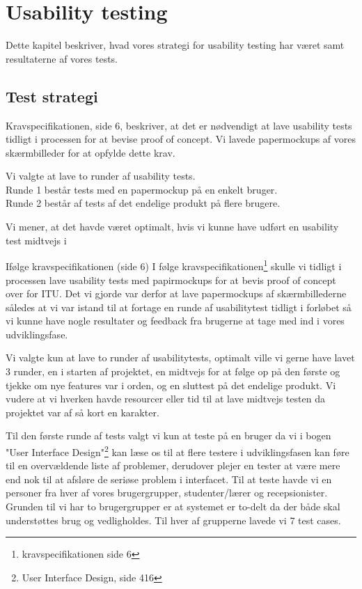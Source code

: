 \chapter{Usability testing}
Dette kapitel beskriver, hvad vores strategi for usability testing har været samt resultaterne af vores tests.

\section{Test strategi}
Kravspecifikationen, side 6, beskriver, at det er nødvendigt at lave usability tests tidligt i processen for at bevise proof of concept. Vi lavede papermockups af vores skærmbilleder for at opfylde dette krav. 

Vi valgte at lave to runder af usability tests.
\\Runde 1 består tests med en papermockup på en enkelt bruger.
\\Runde 2 består af tests af det endelige produkt på flere brugere.

Vi mener, at det havde været optimalt, hvis vi kunne have udført en usability test midtvejs i 

Ifølge kravspecifikationen (side 6)
I følge kravspecifikationen\footnote{kravspecifikationen side 6} skulle vi tidligt i processen lave usability tests med papirmockups for at bevis proof of concept over for ITU. Det vi gjorde var derfor at lave papermockups af skærmbillederne således at vi var istand til at 
fortage en runde af usabilitytest tidligt i forløbet så vi kunne have nogle resultater og feedback fra brugerne at tage med ind i vores udviklingsfase.

Vi valgte kun at lave to runder af usabilitytests, optimalt ville vi gerne have lavet 3 runder, en i starten af projektet, en midtvejs for at følge op på den første og tjekke om nye features var i orden, og en sluttest på det endelige produkt. Vi vudere at vi hverken havde resourcer eller tid til at lave midtvejs testen da projektet var af så kort en karakter.

Til den første runde af tests valgt vi kun at teste på en bruger da vi i bogen "User Interface Design"\footnote{User Interface Design, side 416} kan læse os til at flere testere i udviklingsfasen kan føre til en overvældende liste af problemer, derudover plejer en tester at være mere end nok til at afsløre de seriøse problem i interfacet.
Til at teste havde vi en personer fra hver af vores brugergrupper, studenter/lærer og recepsionister. Grunden til vi har to brugergrupper er at systemet er to-delt da der både skal understøttes brug og vedligholdes. Til hver af grupperne lavede vi 7 test cases.

